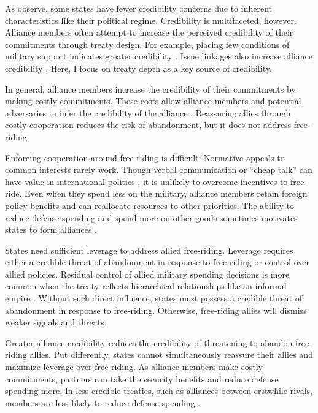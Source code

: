 \documentclass[12pt]{article}
\begin{document}
As \citet{DigiuseppePoast2016} observe, some states have fewer credibility concerns due to inherent characteristics like their political regime. 
Credibility is multifaceted, however. 
Alliance members often attempt to increase the perceived credibility of their commitments through treaty design. 
For example, placing few conditions of military support indicates greater credibility \citep{Benson2012, Chibaetal2015}. 
Issue linkages also increase alliance credibility \citep{LongLeeds2006, Poast2012, Poast2013}. 
Here, I focus on treaty depth as a key source of credibility. 


In general, alliance members increase the credibility of their commitments by making costly commitments. 
These costs allow alliance members and potential adversaries to infer the credibility of the alliance \citep{Leeds2003, FuhrmannSechser2014}. 
Reassuring allies through costly cooperation reduces the risk of abandonment, but it does not address free-riding. 


Enforcing cooperation around free-riding is difficult.
Normative appeals to common interests rarely work. 
Though verbal communication or ``cheap talk'' can have value in international politics \citep{Trager2010}, it is unlikely to overcome incentives to free-ride. 
Even when they spend less on the military, alliance members retain foreign policy benefits and can reallocate resources to other priorities. 
The ability to reduce defense spending and spend more on other goods sometimes motivates states to form alliances \citep{Kimball2010, AllenDigiuseppe2013}. 


States need sufficient leverage to address allied free-riding. 
Leverage requires either a credible threat of abandonment in response to free-riding or control over allied policies. 
Residual control of allied military spending decisions is more common when the treaty reflects hierarchical relationships like an informal empire \citep{Lake1996}. 
Without such direct influence, states must possess a credible threat of abandonment in response to free-riding. 
Otherwise, free-riding allies will dismiss weaker signals and threats. 


Greater alliance credibility reduces the credibility of threatening to abandon free-riding allies. 
Put differently, states cannot simultaneously reassure their allies and maximize leverage over free-riding. 
As alliance members make costly commitments, partners can take the security benefits and reduce defense spending more. 
In less credible treaties, such as alliances between erstwhile rivals, members are less likely to reduce defense spending \citep{NiouZeigler2019}. 
\end{document}

